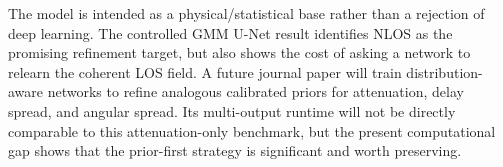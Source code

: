 \documentclass[10pt,conference,letterpaper]{IEEEtran}
\begin{document}
The model is intended as a physical/statistical base rather than a rejection of
deep learning. The controlled GMM U-Net result identifies NLOS as the promising
refinement target, but also shows the cost of asking a network to relearn the
coherent LOS field. A future journal paper will train distribution-aware
networks to refine analogous calibrated priors for attenuation, delay spread,
and angular spread. Its multi-output runtime will not be directly comparable to
this attenuation-only benchmark, but the present computational gap shows that
the prior-first strategy is significant and worth preserving.



\end{document}
